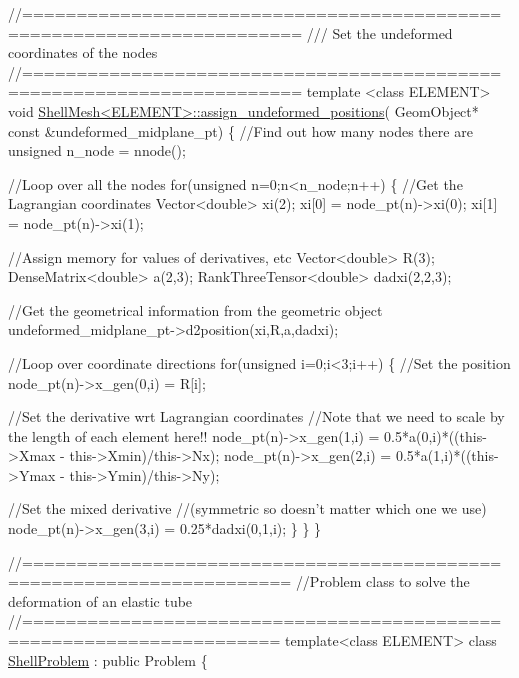 \begin{DoxyCodeInclude}
\textcolor{comment}{//=======================================================================}\textcolor{comment}{}
\textcolor{comment}{/// Set the undeformed coordinates of the nodes}
\textcolor{comment}{}\textcolor{comment}{//=======================================================================}
\textcolor{keyword}{template} <\textcolor{keyword}{class} ELEMENT>
\textcolor{keywordtype}{void} \hyperlink{classShellMesh_a3576870121fad30d0f99588ea8082ca1}{ShellMesh<ELEMENT>::assign\_undeformed\_positions}(
 GeomObject* \textcolor{keyword}{const} &undeformed\_midplane\_pt)
\{
 \textcolor{comment}{//Find out how many nodes there are}
 \textcolor{keywordtype}{unsigned} n\_node = nnode();

 \textcolor{comment}{//Loop over all the nodes}
 \textcolor{keywordflow}{for}(\textcolor{keywordtype}{unsigned} n=0;n<n\_node;n++)
  \{
   \textcolor{comment}{//Get the Lagrangian coordinates}
   Vector<double> xi(2);
   xi[0] = node\_pt(n)->xi(0); 
   xi[1] = node\_pt(n)->xi(1);
   
   \textcolor{comment}{//Assign memory for values of derivatives, etc}
   Vector<double> R(3);
   DenseMatrix<double> a(2,3); 
   RankThreeTensor<double>  dadxi(2,2,3);
   
   \textcolor{comment}{//Get the geometrical information from the geometric object}
   undeformed\_midplane\_pt->d2position(xi,R,a,dadxi);
   
   \textcolor{comment}{//Loop over coordinate directions}
   \textcolor{keywordflow}{for}(\textcolor{keywordtype}{unsigned} i=0;i<3;i++)
    \{
     \textcolor{comment}{//Set the position}
     node\_pt(n)->x\_gen(0,i) = R[i];

     \textcolor{comment}{//Set the derivative wrt Lagrangian coordinates}
     \textcolor{comment}{//Note that we need to scale by the length of each element here!!}
     node\_pt(n)->x\_gen(1,i) = 0.5*a(0,i)*((this->Xmax - this->Xmin)/this->Nx);
     node\_pt(n)->x\_gen(2,i) = 0.5*a(1,i)*((this->Ymax - this->Ymin)/this->Ny);

     \textcolor{comment}{//Set the mixed derivative }
     \textcolor{comment}{//(symmetric so doesn't matter which one we use)}
     node\_pt(n)->x\_gen(3,i) = 0.25*dadxi(0,1,i);
    \}
  \}
\}


\textcolor{comment}{//======================================================================}
\textcolor{comment}{//Problem class to solve the deformation of an elastic tube}
\textcolor{comment}{//=====================================================================}
\textcolor{keyword}{template}<\textcolor{keyword}{class} ELEMENT>
\textcolor{keyword}{class }\hyperlink{classShellProblem}{ShellProblem} : \textcolor{keyword}{public} Problem
\{


\end{DoxyCodeInclude}
